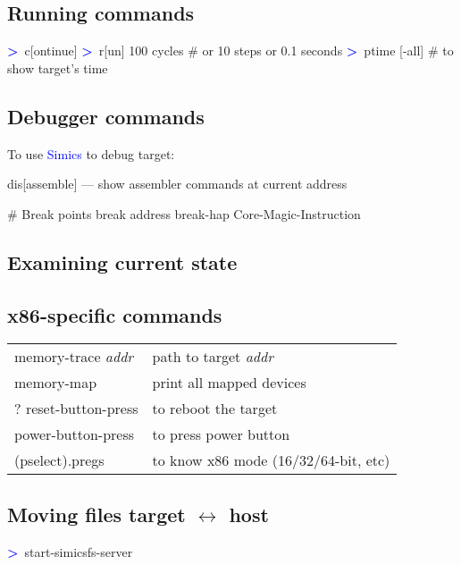 \documentclass[8pt]{extarticle}
\newenvironment{code}[1][]{%
\begin{prebox}[#1]\obeylines}{%
\end{prebox}}
\newcommand{\ind}{\hphantom{~~~}}
\newcommand{\sprompt}{\textcolor{blue}{\textbf{>}\ }}
\newcommand{\p}[1]{\textit{\large#1}}
\newcommand{\Simics}{\textcolor{blue}{Simics}}
\begin{document}
\begin{multicols*}{3}
\subsection{Running commands}
\begin{code}
\sprompt c[ontinue]
\sprompt r[un] 100 cycles \ind \# or 10 steps or 0.1 seconds
\sprompt ptime [-all] \ind \# to show target's time
\end{code}

\subsection{Debugger commands}
To use \Simics{} to debug target:
\begin{code}
dis[assemble] — show assembler commands at current address

\# Break points
break address
break-hap Core-Magic-Instruction
\end{code}

\subsection{Examining current state}

\subsection{x86-specific commands}

\begin{tabular}{ll}
    memory-trace \p{addr} & path to target \p{addr} \\
    memory-map & print all mapped devices \\
    ? reset-button-press & to reboot the target \\
    power-button-press & to press power button \\
    (pselect).pregs & to know x86 mode (16/32/64-bit, etc)
\end{tabular}

\subsection{Moving files target \texorpdfstring{$\longleftrightarrow$}{<->} host}
\begin{code}
\sprompt start-simicsfs-server
\end{code}


\end{multicols*}
\end{document}
